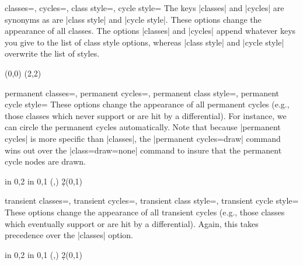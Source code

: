 \documentclass{ltxdoc}
\begin{document}
\begin{sseqdata}[name=ex1,degree={#1}{1-#1}]
\begin{keylist}{classes=, cycles=, class style=, cycle style=}
The keys |classes| and |cycles| are synonyms as are |class style| and |cycle style|. These options change the appearance of all classes. The options |classes| and |cycles| append whatever keys you give to the list of class style options, whereas |class style| and |cycle style| overwrite the list of styles.
\begin{codeexample}[]
\begin{sseqpage}[classes={blue,fill,minimum width=0.5em}]
\class(0,0)
\class(2,2)
\end{sseqpage}
\end{codeexample}
\end{keylist}


\begin{keylist}{permanent classes=, permanent cycles=, permanent class style=, permanent cycle style=}
These options change the appearance of all permanent cycles (e.g., those classes which never support or are hit by a differential). For instance, we can circle the permanent cycles automatically. Note that because |permanent cycles| is more specific than |classes|, the |permanent cycles={draw}| command wins out over the |class={draw=none}| command to insure that the permanent cycle nodes are drawn.
\begin{codeexample}[]
\begin{sseqpage}[cohomological Serre grading, math nodes,
                 classes={draw=none},permanent cycles={draw}]
\foreach \x in {0,2} \foreach \y in {0,1}{
    \class["\mathbb{Z}"](\x,\y)
}
\d2(0,1)
\end{sseqpage}
\end{codeexample}
\end{keylist}

\begin{keylist}{transient classes=, transient cycles=, transient class style=, transient cycle style=}
These options change the appearance of all transient cycles (e.g., those classes which eventually support or are hit by a differential). Again, this takes precedence over the |classes| option.
\begin{codeexample}[]
\begin{sseqpage}[cohomological Serre grading, math nodes,
                 classes={draw=none}, transient cycles=red]
\foreach \x in {0,2} \foreach \y in {0,1}{
    \class["\mathbb{Z}"](\x,\y)
}
\d2(0,1)
\end{sseqpage}
\end{codeexample}
\end{keylist}


\end{sseqdata}
\end{document}
